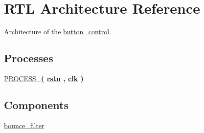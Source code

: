 \hypertarget{classbutton__control_1_1RTL}{\section{R\-T\-L Architecture Reference}
\label{classbutton__control_1_1RTL}
}


Architecture of the \hyperlink{classbutton__control}{button\-\_\-control}.  


\subsection*{Processes}
 \begin{DoxyCompactItemize}
\item 
\hypertarget{classbutton__control_1_1RTL_a6824e9b2c53c03ada87de6293f641498}{\hyperlink{classbutton__control_1_1RTL_a6824e9b2c53c03ada87de6293f641498}{P\-R\-O\-C\-E\-S\-S\-\_}{\bfseries  ( {\bfseries {\bfseries \hyperlink{classbutton__control_aba021aec4b477b89079bb58ccadcc67e}{rstn}} \textcolor{vhdlchar}{ }\textcolor{vhdlchar}{ }\textcolor{vhdlchar}{ }} , {\bfseries {\bfseries \hyperlink{classbutton__control_a8120037e0ee47c35ba2d79242209c72e}{clk}} \textcolor{vhdlchar}{ }} )}}\label{classbutton__control_1_1RTL_a6824e9b2c53c03ada87de6293f641498}

\end{DoxyCompactItemize}
\subsection*{Components}
 \begin{DoxyCompactItemize}
\item 
\hypertarget{classbutton__control_1_1RTL_a3984c4f45c218611ebbd166fc1fc6a67}{\hyperlink{classbutton__control_1_1RTL_a3984c4f45c218611ebbd166fc1fc6a67}{bounce\-\_\-filter}  {\bfseries }  }\label{classbutton__control_1_1RTL_a3984c4f45c218611ebbd166fc1fc6a67}

\end{DoxyCompactItemize}
